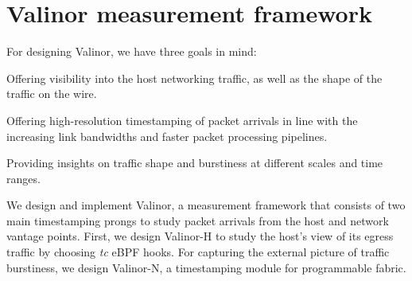 
\section{Valinor measurement framework}
\label{sec:valinor}

For designing Valinor, we have three goals in mind:
\begin{compactenum}
    \item Offering visibility into the host networking traffic, as well as the shape of the traffic on the wire.
    \item Offering high-resolution timestamping of packet arrivals in line with the increasing link bandwidths and faster packet processing pipelines.
    \item Providing insights on traffic shape and burstiness at different scales and time ranges.
\end{compactenum}

We design and implement Valinor, a measurement framework that consists of two main timestamping prongs to study packet arrivals from the host and network vantage points.
First, we design Valinor-H to study the host's view of its egress traffic by choosing \textit{tc} eBPF hooks. For capturing the external picture of traffic burstiness, we design Valinor-N, a timestamping module for programmable fabric.

